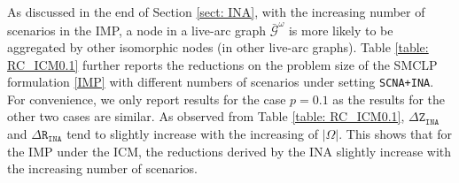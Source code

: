 \documentclass[a4paper,10pt]{article}
\theoremstyle{plain}
\newcommand{\revv}[1]{{#1}}
\newcommand{\INA}{{\texttt{SCNA+INA}}}
\newcommand{\DeltaZINA}{{\Delta\texttt{Z}_\texttt{INA}}}
\newcommand{\DeltaRINA}{{\Delta\texttt{R}_\texttt{INA}}}
\begin{document}
{	As discussed in the end of \revv{Section} \ref{sect: INA}, with the increasing number of \revv{scenarios} in the IMP,
	a node in a live-arc graph $\bar{\mathcal{G}}^\omega$ is more likely to be aggregated by other isomorphic nodes (in other live-arc graphs).
	Table \ref{table: RC_ICM0.1} further reports the reductions on the problem size of the SMCLP formulation \eqref{IMP} with different numbers of \revv{scenarios} under setting \INA.
	For convenience, we only report results for the case $p=0.1$ as the results for the other two cases are similar.
	\revv{As observed from Table \ref{table: RC_ICM0.1}, $\DeltaZINA$ and $\DeltaRINA$ tend to slightly increase with the increasing of $|\Omega|$.
		This shows that for the IMP under the ICM, the reductions derived by the INA slightly increase with the increasing number of scenarios.}
	
	
	
	
	
	
	
	
	
}
\end{document}

